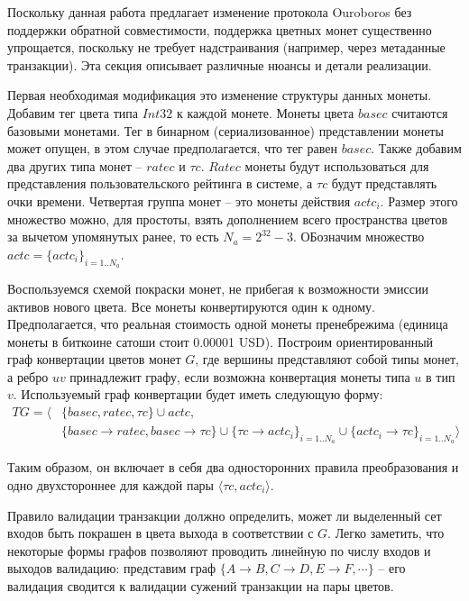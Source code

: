 \documentclass[]{itmo-student-thesis}
\begin{document}
Поскольку данная работа предлагает изменение протокола Ouroboros без
поддержки обратной совместимости, поддержка цветных монет существенно
упрощается, поскольку не требует надстраивания (например, через
метаданные транзакции). Эта секция описывает различные нюансы и детали
реализации.

Первая необходимая модификация это изменение структуры данных
монеты. Добавим тег цвета типа $Int32$ к каждой монете. Монеты цвета
$basec$ считаются базовыми монетами. Тег в бинарном (сериализованное)
представлении монеты может опущен, в этом случае предполагается, что
тег равен $basec$. Также добавим два других типа монет -- $ratec$ и
$\tau c$. $Ratec$ монеты будут использоваться для представления
пользовательского рейтинга в системе, а $\tau c$ будут представлять
очки времени. Четвертая группа монет -- это монеты действия
$actc_i$. Размер этого множество можно, для простоты, взять
дополнением всего пространства цветов за вычетом упомянутых ранее, то
есть $N_a = 2^{32}-3$. ОБозначим множество $actc = \{actc_i\}_{i=1..N_a}$.

Воспользуемся схемой покраски монет, не прибегая к возможности эмиссии
активов нового цвета. Все монеты конвертируются один к
одному. Предполагается, что реальная стоимость одной монеты
пренебрежима (единица монеты в биткоине сатоши стоит 0.00001
USD). Построим ориентированный граф конвертации цветов монет $G$, где
вершины представляют собой типы монет, а ребро $uv$ принадлежит графу,
если возможна конвертация монеты типа $u$ в тип $v$. Используемый граф
конвертации будет иметь следующую форму:
\begin{align*}
  TG = \langle &\{basec, ratec, \tau c\} \cup actc,\\
  &\{basec \rightarrow ratec
  , basec \rightarrow \tau c\} \cup
  \{\tau c \rightarrow actc_i\}_{i=1..N_a} \cup
  \{actc_i \rightarrow \tau c\}_{i=1..N_a}\rangle
\end{align*}

Таким образом, он включает в себя два односторонних правила
преобразования и одно двухстороннее для каждой пары $\langle \tau c,
actc_i\rangle$.

Правило валидации транзакции должно определить, может ли выделенный
сет входов быть покрашен в цвета выхода в соответствии с $G$. Легко
заметить, что некоторые формы графов позволяют проводить линейную по
числу входов и выходов валидацию: представим граф $\{A \rightarrow B,
C \rightarrow D, E \rightarrow F, \cdots\}$ -- его валидация сводится
к валидации сужений транзакции на пары цветов.
\end{document}
